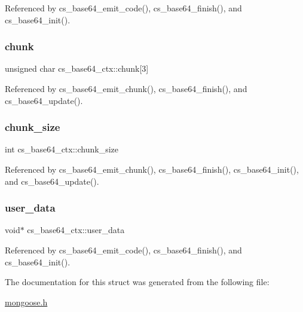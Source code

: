 Referenced by cs\+\_\+base64\+\_\+emit\+\_\+code(), cs\+\_\+base64\+\_\+finish(), and cs\+\_\+base64\+\_\+init().

\mbox{\label{structcs__base64__ctx_a209b5eff716d6a1850cca128ed5b070e_a209b5eff716d6a1850cca128ed5b070e}} 
\subsubsection{\texorpdfstring{chunk}{chunk}}
{\footnotesize\ttfamily unsigned char cs\+\_\+base64\+\_\+ctx\+::chunk\mbox{[}3\mbox{]}}



Referenced by cs\+\_\+base64\+\_\+emit\+\_\+chunk(), cs\+\_\+base64\+\_\+finish(), and cs\+\_\+base64\+\_\+update().

\mbox{\label{structcs__base64__ctx_a5753baf57fe83161369e2270d57e4a9e_a5753baf57fe83161369e2270d57e4a9e}} 
\subsubsection{\texorpdfstring{chunk\+\_\+size}{chunk\_size}}
{\footnotesize\ttfamily int cs\+\_\+base64\+\_\+ctx\+::chunk\+\_\+size}



Referenced by cs\+\_\+base64\+\_\+emit\+\_\+chunk(), cs\+\_\+base64\+\_\+finish(), cs\+\_\+base64\+\_\+init(), and cs\+\_\+base64\+\_\+update().

\mbox{\label{structcs__base64__ctx_ac6023cc2887001835a99b6a71db9f43b_ac6023cc2887001835a99b6a71db9f43b}} 
\subsubsection{\texorpdfstring{user\+\_\+data}{user\_data}}
{\footnotesize\ttfamily void$\ast$ cs\+\_\+base64\+\_\+ctx\+::user\+\_\+data}



Referenced by cs\+\_\+base64\+\_\+emit\+\_\+code(), cs\+\_\+base64\+\_\+finish(), and cs\+\_\+base64\+\_\+init().



The documentation for this struct was generated from the following file\+:\begin{DoxyCompactItemize}
\item 
\hyperlink{mongoose_8h}{mongoose.\+h}\end{DoxyCompactItemize}
